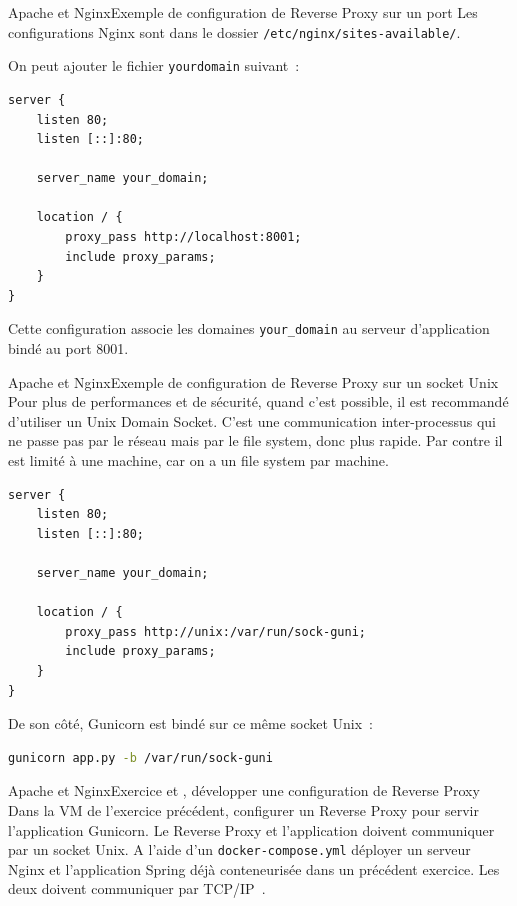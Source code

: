 \documentclass{beamer}
\begin{document}
    \begin{frame}[fragile]{Apache et Nginx}{Exemple de configuration de Reverse Proxy sur un port}
        Les configurations Nginx sont dans le dossier \lstinline{/etc/nginx/sites-available/}.

        On peut ajouter le fichier \lstinline{yourdomain} suivant~:
        \begin{lstlisting}
server {
    listen 80;
    listen [::]:80;

    server_name your_domain;

    location / {
        proxy_pass http://localhost:8001;
        include proxy_params;
    }
}
        \end{lstlisting}
        Cette configuration associe les domaines \lstinline{your_domain} au serveur d'application bindé au port 8001.
    \end{frame}

    \begin{frame}[fragile]{Apache et Nginx}{Exemple de configuration de Reverse Proxy sur un socket Unix}
        Pour plus de performances et de sécurité, quand c'est possible, il est recommandé d'utiliser un Unix Domain Socket.
        C'est une communication inter-processus qui ne passe pas par le réseau mais par le file system, donc plus rapide.
        Par contre il est limité à une machine, car on a un file system par machine.
        \begin{lstlisting}
server {
    listen 80;
    listen [::]:80;

    server_name your_domain;

    location / {
        proxy_pass http://unix:/var/run/sock-guni;
        include proxy_params;
    }
}
        \end{lstlisting}
        De son côté, Gunicorn est bindé sur ce même socket Unix~:
        \begin{lstlisting}[language=bash]
gunicorn app.py -b /var/run/sock-guni
        \end{lstlisting}
    \end{frame}

    \begin{frame}{Apache et Nginx}{Exercice \execcounterdispinc{} et \execcounterdispinc{}, développer une configuration de Reverse Proxy}
        \setlength\parindent{24pt}
        Dans la VM de l'exercice précédent, configurer un Reverse Proxy pour servir l'application Gunicorn.
        Le Reverse Proxy et l'application doivent communiquer par un socket Unix.
        \bigbreak
        A l'aide d'un \lstinline{docker-compose.yml} déployer un serveur Nginx et l'application Spring déjà conteneurisée dans un précédent exercice.
        Les deux doivent communiquer par TCP/IP~.
        \setlength\parindent{0pt}
    \end{frame}
\end{document}
